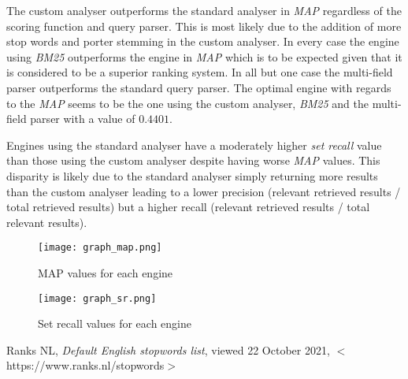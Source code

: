 \documentclass[journal]{IEEEtran}
\begin{document}
The custom analyser outperforms the standard analyser in \textit{MAP} regardless of the scoring function and query parser. This is most likely due to the addition of more stop words and porter stemming in the custom analyser. In every case the engine using \textit{BM25} outperforms the  engine in \textit{MAP} which is to be expected given that it is considered to be a superior ranking system. In all but one case the multi-field parser outperforms the standard query parser. The optimal engine with regards to the \textit{MAP} seems to be the one using the custom analyser, \textit{BM25} and the multi-field parser with a value of $0.4401$.

Engines using the standard analyser have a moderately higher \textit{set recall} value than those using the custom analyser despite having worse \textit{MAP} values. This disparity is likely due to the standard analyser simply returning more results than the custom analyser leading to a lower precision (relevant retrieved results / total retrieved results) but a higher recall (relevant retrieved results / total relevant results).

\begin{figure}[!t]
\centering
\texttt{[image: graph\_map.png]}
\captionsetup{justification=centering}
\caption{MAP values for each engine}
\label{fig_sim}
\end{figure}

\begin{figure}[!t]
\centering
\texttt{[image: graph\_sr.png]}
\captionsetup{justification=centering}
\caption{Set recall values for each engine}
\label{fig_sim}
\end{figure}

\begin{thebibliography}{1}

 Ranks NL, \emph{Default English stopwords list}, viewed 22 October 2021, $<$https://www.ranks.nl/stopwords$>$

\end{thebibliography}
\end{document}
